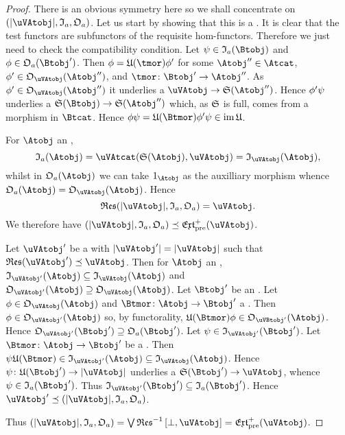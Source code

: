 \documentclass[%
12pt,%
arxiv,%
defaults
]{myclass}
\begin{document}
\begin{proof}
There is an obvious symmetry here so we shall concentrate on \((\forfunc[\uVAtobj], \itest_a, \otest_a)\).
Let us start by showing that this is a \uVBtobj.
It is clear that the test functors are subfunctors of the requisite hom\hyp{}functors.
Therefore we just need to check the compatibility condition.
Let \(\ifn \in \itest_a(\Btobj)\) and \(\ofn \in \otest_a(\Btobj')\).
Then \(\ofn = \ufunc(\tmor) \ofn'\) for some \(\Atobj'' \in \Atcat\), \(\ofn' \in \otest_{\uVAtobj}(\Atobj'')\), and \(\tmor \colon \Btobj' \to \Atobj''\).
As \(\ofn' \in \otest_{\uVAtobj}(\Atobj'')\) it underlies a \uVBtmor \(\uVAtobj \to \sfunc(\Atobj'')\).
Hence \(\phi' \psi\) underlies a \uVBtmor \(\sfunc(\Btobj) \to \sfunc(\Atobj'')\) which, as \(\sfunc\) is full, comes from a morphism in \(\Btcat\).
Hence \(\ofn \ifn = \ufunc(\Btmor) \ofn' \ifn \in \im \ufunc\).

For \(\Atobj\) an \Atobjalt,
%
\[
  \itest_a(\Atobj) = \Hom{\uVAtcat}{\sfunc(\Atobj)}{\uVAtobj} = \itest_{\uVAtobj}(\Atobj),
\]
%
whilst in \(\otest_a(\Atobj)\) we can take \(1_{\Atobj}\) as the auxilliary morphism whence \(\otest_a(\Atobj) = \otest_{\uVAtobj}(\Atobj)\).
Hence
%
\[
  \resfunc(\forfunc[\uVAtobj], \itest_a, \otest_a) = \uVAtobj.
\]
%
We therefore have \((\forfunc[\uVAtobj], \itest_a, \otest_a) \preceq \PJextfunc(\uVAtobj)\).

Let \(\uVAtobj'\) be a \uVAtobjalt with \(\forfunc[\uVAtobj'] = \forfunc[\uVAtobj]\) such that \(\resfunc(\uVAtobj') \preceq \uVAtobj\).
Then for \(\Atobj\) an \Atobjalt, \(\itest_{\uVAtobj'}(\Atobj) \subseteq \itest_{\uVAtobj}(\Atobj)\) and \(\otest_{\uVAtobj'}(\Atobj) \supseteq \otest_{\uVAtobj}(\Atobj)\).
Let \(\Btobj'\) be an \Btobjalt.
Let \(\ofn \in \otest_{\uVAtobj}(\Atobj)\) and \(\Btmor \colon \Atobj \to \Btobj'\) a \Btmor.
Then \(\ofn \in \otest_{\uVAtobj'}(\Atobj)\) so, by functorality, \(\ufunc(\Btmor) \ofn \in \otest_{\uVBtobj'}(\Atobj)\).
Hence \(\otest_{\uVAtobj'}(\Btobj') \supseteq \otest_a(\Btobj')\).
Let \(\ifn \in \itest_{\uVAtobj'}(\Btobj')\).
Let \(\Btmor \colon \Atobj \to \Btobj'\) be a \Btmor.
Then \(\ifn \ufunc(\Btmor) \in \itest_{\uVAtobj'}(\Atobj) \subseteq \itest_{\uVAtobj}(\Atobj)\).
Hence \(\ifn \colon \ufunc(\Btobj') \to \forfunc[\uVAtobj]\) underlies a \uVBtmor \(\sfunc(\Btobj') \to \uVAtobj\), whence \(\ifn \in \itest_a(\Btobj')\).
Thus \(\itest_{\uVAtobj'}(\Btobj') \subseteq \itest_a(\Btobj')\).
Hence \(\uVAtobj' \preceq (\forfunc[\uVAtobj], \itest_a, \otest_a)\).

Thus \((\forfunc[\uVAtobj], \itest_a, \otest_a) = \join \resfunc^{-1}\left[\bot, \uVAtobj\right] = \PJextfunc(\uVAtobj)\).
\end{proof}
\end{document}
